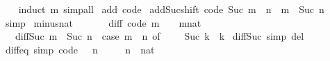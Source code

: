 \begin{isabellebody}
%
\isadelimproof
\ \ %
\endisadelimproof
%
\isatagproof
{}\isamarkupfalse%
\ {\isacharparenleft}{\kern0pt}induct\ m{\isacharparenright}{\kern0pt}\ simp{\isacharunderscore}{\kern0pt}all%
\endisatagproof
{\isafoldproof}%
%
\isadelimproof
\isanewline
%
\endisadelimproof
\isanewline
{}\isamarkupfalse%
\ add{\isacharunderscore}{\kern0pt}{}\ {\isacharbrackleft}{\kern0pt}code{\isacharbrackright}{\kern0pt}\isanewline
\isanewline
{}\isamarkupfalse%
\ add{\isacharunderscore}{\kern0pt}Suc{\isacharunderscore}{\kern0pt}shift\ {\isacharbrackleft}{\kern0pt}code{\isacharbrackright}{\kern0pt}{\isacharcolon}{\kern0pt}\ {\isachardoublequoteopen}Suc\ m\ {\isacharplus}{\kern0pt}\ n\ {\isacharequal}{\kern0pt}\ m\ {\isacharplus}{\kern0pt}\ Suc\ n{\isachardoublequoteclose}\isanewline
%
\isadelimproof
\ \ %
\endisadelimproof
%
\isatagproof
{}\isamarkupfalse%
\ simp%
\endisatagproof
{\isafoldproof}%
%
\isadelimproof
\isanewline
%
\endisadelimproof
\isanewline
{}\isamarkupfalse%
\ minus{\isacharunderscore}{\kern0pt}nat\isanewline
\ \ \isanewline
\ \ \ \ diff{\isacharunderscore}{\kern0pt}{}\ {\isacharbrackleft}{\kern0pt}code{\isacharbrackright}{\kern0pt}{\isacharcolon}{\kern0pt}\ {\isachardoublequoteopen}m\ {\isacharminus}{\kern0pt}\ {}\ {\isacharequal}{\kern0pt}\ {\isacharparenleft}{\kern0pt}m{\isacharcolon}{\kern0pt}{\isacharcolon}{\kern0pt}nat{\isacharparenright}{\kern0pt}{\isachardoublequoteclose}\isanewline
\ \ {\isacharbar}{\kern0pt}\ diff{\isacharunderscore}{\kern0pt}Suc{\isacharcolon}{\kern0pt}\ {\isachardoublequoteopen}m\ {\isacharminus}{\kern0pt}\ Suc\ n\ {\isacharequal}{\kern0pt}\ {\isacharparenleft}{\kern0pt}case\ m\ {\isacharminus}{\kern0pt}\ n\ of\ {}\ {\isasymRightarrow}\ {}\ {\isacharbar}{\kern0pt}\ Suc\ k\ {\isasymRightarrow}\ k{\isacharparenright}{\kern0pt}{\isachardoublequoteclose}\isanewline
\isanewline
{}\isamarkupfalse%
\ diff{\isacharunderscore}{\kern0pt}Suc\ {\isacharbrackleft}{\kern0pt}simp\ del{\isacharbrackright}{\kern0pt}\isanewline
\isanewline
{}\isamarkupfalse%
\ diff{\isacharunderscore}{\kern0pt}{}{\isacharunderscore}{\kern0pt}eq{\isacharunderscore}{\kern0pt}{}\ {\isacharbrackleft}{\kern0pt}simp{\isacharcomma}{\kern0pt}\ code{\isacharbrackright}{\kern0pt}{\isacharcolon}{\kern0pt}\ {\isachardoublequoteopen}{}\ {\isacharminus}{\kern0pt}\ n\ {\isacharequal}{\kern0pt}\ {}{\isachardoublequoteclose}\isanewline
\ \ \ n\ {\isacharcolon}{\kern0pt}{\isacharcolon}{\kern0pt}\ nat\isanewline

\end{isabellebody}
